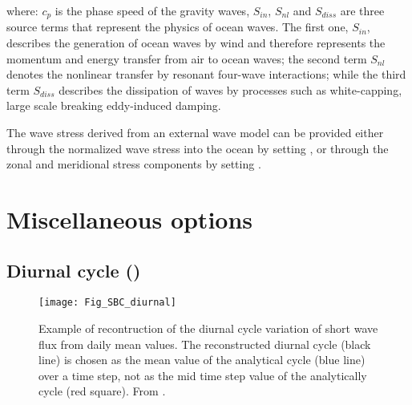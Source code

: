 \documentclass[../main/NEMO_manual]{subfiles}
\begin{document}
where: $c_p$ is the phase speed of the gravity waves,
$S_{in}$, $S_{nl}$ and $S_{diss}$ are three source terms that represent 
the physics of ocean waves. The first one, $S_{in}$, describes the generation 
of ocean waves by wind and therefore represents the momentum and energy transfer 
from air to ocean waves; the second term $S_{nl}$ denotes 
the nonlinear transfer by resonant four-wave interactions; while the third term $S_{diss}$ 
describes the dissipation of waves by processes such as white-capping, large scale breaking 
eddy-induced damping.

The wave stress derived from an external wave model can be provided either through the normalized 
wave stress into the ocean by setting , or through the zonal and 
meridional stress components by setting .


\section{Miscellaneous options}
\label{sec:SBC_misc}

\subsection{Diurnal cycle (\protect{})}
\label{subsec:SBC_dcy}
%

\begin{figure}[!t]
  \begin{center}
    \texttt{[image: Fig\_SBC\_diurnal]}
    \caption{
      \protect\label{fig:SBC_diurnal}
      Example of recontruction of the diurnal cycle variation of short wave flux from daily mean values.
      The reconstructed diurnal cycle (black line) is chosen as
      the mean value of the analytical cycle (blue line) over a time step,
      not as the mid time step value of the analytically cycle (red square).
      From \citet{Bernie_al_CD07}.
    }
  \end{center}
\end{figure}
\end{document}
